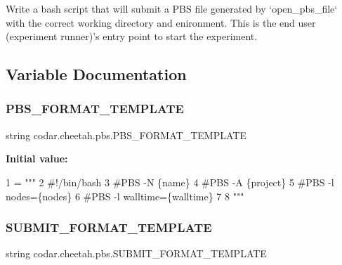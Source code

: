 \begin{DoxyVerb}Write a bash script that will submit a PBS file generated by
`open_pbs_file` with the correct working directory and enironment.
This is the end user (experiment runner)'s entry point to start the
experiment.
\end{DoxyVerb}
 

\subsection{Variable Documentation}
\mbox{\label{namespacecodar_1_1cheetah_1_1pbs_a076dd2388cec6ba878adff6363356c1f}} 
\subsubsection{\texorpdfstring{P\+B\+S\+\_\+\+F\+O\+R\+M\+A\+T\+\_\+\+T\+E\+M\+P\+L\+A\+TE}{PBS\_FORMAT\_TEMPLATE}}
{\footnotesize\ttfamily string codar.\+cheetah.\+pbs.\+P\+B\+S\+\_\+\+F\+O\+R\+M\+A\+T\+\_\+\+T\+E\+M\+P\+L\+A\+TE}

{\bfseries Initial value\+:}
\begin{DoxyCode}
1 =  \textcolor{stringliteral}{"""}
2 \textcolor{stringliteral}{#!/bin/bash}
3 \textcolor{stringliteral}{#PBS -N \{name\}}
4 \textcolor{stringliteral}{#PBS -A \{project\}}
5 \textcolor{stringliteral}{#PBS -l nodes=\{nodes\}}
6 \textcolor{stringliteral}{#PBS -l walltime=\{walltime\}}
7 \textcolor{stringliteral}{}
8 \textcolor{stringliteral}{"""}
\end{DoxyCode}
\mbox{\label{namespacecodar_1_1cheetah_1_1pbs_af0456cd6c62ec9db8b9fdfafc248b940}} 
\subsubsection{\texorpdfstring{S\+U\+B\+M\+I\+T\+\_\+\+F\+O\+R\+M\+A\+T\+\_\+\+T\+E\+M\+P\+L\+A\+TE}{SUBMIT\_FORMAT\_TEMPLATE}}
{\footnotesize\ttfamily string codar.\+cheetah.\+pbs.\+S\+U\+B\+M\+I\+T\+\_\+\+F\+O\+R\+M\+A\+T\+\_\+\+T\+E\+M\+P\+L\+A\+TE}

